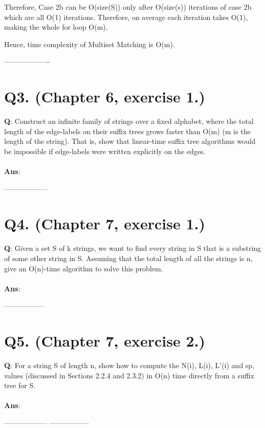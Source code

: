 \documentclass[a4paper,11pt]{article}
\begin{document}
Therefore, Case 2b can be O(size(S)) only after O(size(s)) iterations of case 2b which are all O(1) iterations. Therefore, on average each iteration takes O(1), making the whole for loop O(m).

Hence, time complexity of Multiset Matching is O(m).
\begin{center}
 -------------------
\end{center}

\section*{Q3. (Chapter 6, exercise 1.)}
\textbf{Q}: Construct an infinite family of strings over a fixed alphabet, where the total length of the
edge-labels on their suffix trees grows faster than O(m) (m is the length of the string). That
is, show that linear-time suffix tree algorithms would be impossible if edge-labels were
written explicitly on the edges.
\\
\\
\textbf{Ans}: 
\begin{center}
 ------------------
\end{center}
\section*{Q4. (Chapter 7, exercise 1.)}
\textbf{Q}: Given a set S of k strings, we want to find every string in S that is a substring of some other string in S. Assuming that the total length of all the strings is n, give an O(n)-time algorithm to solve this problem. 
\\
\\
\textbf{Ans}:

\begin{center}
-----------------\\
\end{center}

\section*{Q5. (Chapter 7, exercise 2.)}
\textbf{Q}: For a string S of length n, show how to compute the N(i), L(i), L'(i) and sp, values (discussed in Sections 2.2.4 and 2.3.2) in O(n) time directly from a suffix tree for S.
\\
\\
\textbf{Ans}:

\begin{center}

 ------------------ -----------------
\end{center}
\end{document}
